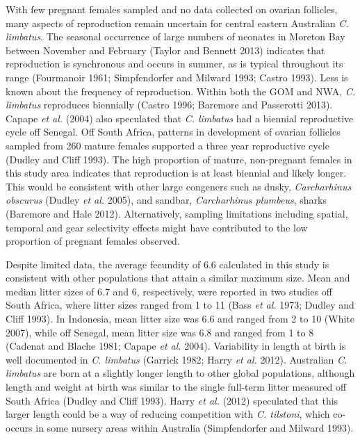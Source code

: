 \documentclass[]{article}
\begin{document}
With few pregnant females sampled and no data collected on ovarian
follicles, many aspects of reproduction remain uncertain for central
eastern Australian \emph{C. limbatus}. The seasonal occurrence of large
numbers of neonates in Moreton Bay between November and February (Taylor
and Bennett 2013) indicates that reproduction is synchronous and occurs
in summer, as is typical throughout its range (Fourmanoir 1961;
Simpfendorfer and Milward 1993; Castro 1993). Less is known about the
frequency of reproduction. Within both the GOM and NWA, \emph{C.
limbatus} reproduces biennially (Castro 1996; Baremore and Passerotti
2013). Capape \emph{et al.} (2004) also speculated that \emph{C.
limbatus} had a biennial reproductive cycle off Senegal. Off South
Africa, patterns in development of ovarian follicles sampled from 260
mature females supported a three year reproductive cycle (Dudley and
Cliff 1993). The high proportion of mature, non-pregnant females in this
study area indicates that reproduction is at least biennial and likely
longer. This would be consistent with other large congeners such as
dusky, \emph{Carcharhinus obscurus} (Dudley \emph{et al.} 2005), and
sandbar, \emph{Carcharhinus plumbeus}, sharks (Baremore and Hale 2012).
Alternatively, sampling limitations including spatial, temporal and gear
selectivity effects might have contributed to the low proportion of
pregnant females observed.

Despite limited data, the average fecundity of 6.6 calculated in this
study is consistent with other populations that attain a similar maximum
size. Mean and median litter sizes of 6.7 and 6, respectively, were
reported in two studies off South Africa, where litter sizes ranged from
1 to 11 (Bass \emph{et al.} 1973; Dudley and Cliff 1993). In Indonesia,
mean litter size was 6.6 and ranged from 2 to 10 (White 2007), while off
Senegal, mean litter size was 6.8 and ranged from 1 to 8 (Cadenat and
Blache 1981; Capape \emph{et al.} 2004). Variability in length at birth
is well documented in \emph{C. limbatus} (Garrick 1982; Harry \emph{et
al.} 2012). Australian \emph{C. limbatus} are born at a slightly longer
length to other global populations, although length and weight at birth
was similar to the single full-term litter measured off South Africa
(Dudley and Cliff 1993). Harry \emph{et al.} (2012) speculated that this
larger length could be a way of reducing competition with \emph{C.
tilstoni}, which co-occurs in some nursery areas within Australia
(Simpfendorfer and Milward 1993).
\end{document}

